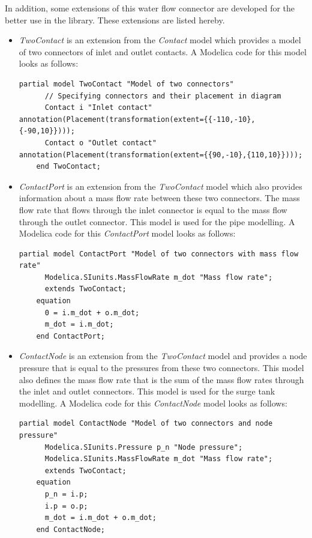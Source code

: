 \documentclass[%
]{USN-PhD}
\begin{document}
In addition, some extensions of this water flow connector are developed for the better use in the library. These extensions are listed hereby.
\begin{itemize}
    \item \emph{TwoContact} is an extension from the \emph{Contact} model which provides a model of two connectors of inlet and outlet contacts. A Modelica code for this model looks as follows:
    \begin{lstlisting}[language = modelica]
    partial model TwoContact "Model of two connectors"
      // Specifying connectors and their placement in diagram
      Contact i "Inlet contact" annotation(Placement(transformation(extent={{-110,-10},{-90,10}})));
      Contact o "Outlet contact" annotation(Placement(transformation(extent={{90,-10},{110,10}})));
    end TwoContact;
    \end{lstlisting}
    \item \emph{ContactPort} is an extension from the \emph{TwoContact} model which also provides information about a mass flow rate between these two connectors. The mass flow rate that flows through the inlet connector is equal to the mass flow through the outlet connector. This model is used for the pipe modelling. A Modelica code for this \emph{ContactPort} model looks as follows:
    \begin{lstlisting}[language = modelica]
    partial model ContactPort "Model of two connectors with mass flow rate"
      Modelica.SIunits.MassFlowRate m_dot "Mass flow rate";
      extends TwoContact;
    equation
      0 = i.m_dot + o.m_dot;
      m_dot = i.m_dot;
    end ContactPort;
    \end{lstlisting}
    \item \emph{ContactNode} is an extension from the \emph{TwoContact} model and provides a node pressure that is equal to the pressures from these two connectors. This model also defines the mass flow rate that is the sum of the mass flow rates through the inlet and outlet connectors. This model is used for the surge tank modelling. A Modelica code for this \emph{ContactNode} model looks as follows:
    \begin{lstlisting}[language = modelica]
    partial model ContactNode "Model of two connectors and node pressure"
      Modelica.SIunits.Pressure p_n "Node pressure";
      Modelica.SIunits.MassFlowRate m_dot "Mass flow rate";
      extends TwoContact;
    equation
      p_n = i.p;
      i.p = o.p;
      m_dot = i.m_dot + o.m_dot;
    end ContactNode;
    \end{lstlisting}

\end{itemize}
\end{document}
